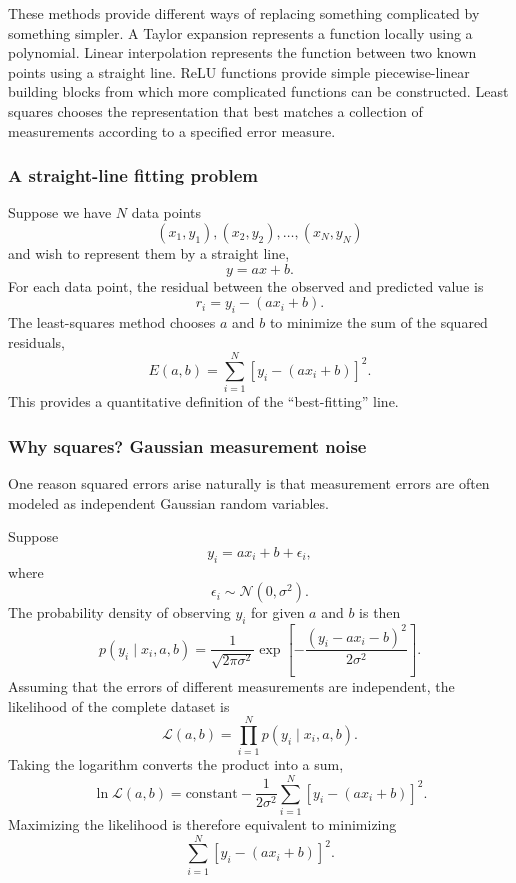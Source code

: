 These methods provide different ways of replacing something complicated by something simpler.
A Taylor expansion represents a function locally using a polynomial.
Linear interpolation represents the function between two known points using a straight line.
ReLU functions provide simple piecewise-linear building blocks from which more complicated functions can be constructed.
Least squares chooses the representation that best matches a collection of measurements according to a specified error measure.



\subsubsection{A straight-line fitting problem}
\label{sec:fit}



Suppose we have $N$ data points
\[
    (x_1,y_1),(x_2,y_2),\ldots,(x_N,y_N)
\]
and wish to represent them by a straight line,
\[
    y=ax+b.
\]
For each data point, the residual between the observed and predicted value is
\[
    r_i=y_i-(ax_i+b).
\]
The least-squares method chooses $a$ and $b$ to minimize the sum of the squared residuals,
\[
    E(a,b)=\sum_{i=1}^{N}\left[y_i-(ax_i+b)\right]^2.
\]
This provides a quantitative definition of the ``best-fitting'' line.



\subsubsection{Why squares? Gaussian measurement noise}
\label{sec:gaussian-noise}


One reason squared errors arise naturally is that measurement errors are often modeled as independent Gaussian random variables.

Suppose
\[
    y_i=ax_i+b+\epsilon_i,
\]
where
\[
    \epsilon_i\sim\mathcal{N}(0,\sigma^2).
\]
The probability density of observing $y_i$ for given $a$ and $b$ is then
\[
    p(y_i\mid x_i,a,b)=\frac{1}{\sqrt{2\pi\sigma^2}}\exp\left[-\frac{\left(y_i-ax_i-b\right)^2}{2\sigma^2}\right].
\]
Assuming that the errors of different measurements are independent, the likelihood of the complete dataset is
\[
    \mathcal{L}(a,b)=\prod_{i=1}^{N}p(y_i\mid x_i,a,b).
\]
Taking the logarithm converts the product into a sum,
\[
    \ln\mathcal{L}(a,b)=\text{constant}-\frac{1}{2\sigma^2}\sum_{i=1}^{N}\left[y_i-(ax_i+b)\right]^2.
\]
Maximizing the likelihood is therefore equivalent to minimizing
\[
    \sum_{i=1}^{N}\left[y_i-(ax_i+b)\right]^2.
\]

